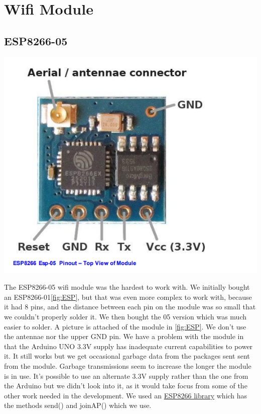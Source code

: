 \documentclass[a4paper,12pt,oneside,openright,titlepage]{book}
\begin{document}
\section{Wifi Module}
\subsection{ESP8266-05}
\begin{center}
	\includegraphics[scale=0.3]{ESP8266}
\end{center}

The ESP8266-05 wifi module was the hardest to work with. We initially bought an ESP8266-01\ref{fig:ESP}, but that was even more complex to work with, because it had 8 pins, and the distance between each pin on the module was so small that we couldn't properly solder it. We then bought the 05 version which was much easier to solder. A picture is attached of the module in \ref{fig:ESP}. We don't use the antennae nor the upper GND pin. We have a problem with the module in that the Arduino UNO 3.3V supply has inadequate current capabilities to power it. It still works but we get occasional garbage data from the packages sent sent from the module. Garbage transmissions seem to increase the longer the module is in use. It's possible to use an alternate 3.3V supply rather than the one from the Arduino but we didn't look into it, as it would take focus from some of the other work needed in the development. We used an \href{https://github.com/Hergeirs/Arduino2/blob/master/FWG7RQ3IRXT1DFL/ESP8266.h}{ESP8266 library} which  has the methods send() and joinAP() which we use.
\end{document}
